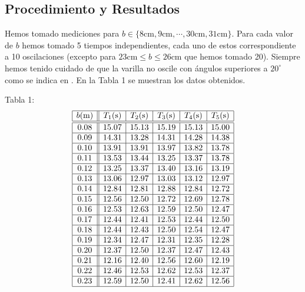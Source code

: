 \documentclass{article}
\begin{document}
\begin{multicols}{2}
\section*{Procedimiento y Resultados}
Hemos tomado mediciones para $b\in \{8\text{cm}, 9\text{cm}, \cdots, 30\text{cm}, 31\text{cm}\}$. Para cada valor de $b$ hemos tomado 5 tiempos independientes, cada uno de estos correspondiente a 10 oscilaciones (excepto para $23 \text{cm}\le b \le 26\text{cm}$ que hemos tomado 20). Siempre hemos tenido cuidado de que la varilla no oscile con ángulos superiores a $20^\circ$ como se indica en \cite{web}. En la Tabla 1 se muestran los datos obtenidos.
\begin{center}
Tabla 1:
$$
    \begin{array}{|c||c|c|c|c|c|} \hline
        b\text{(m)} & T_1\text{(s)} & T_2\text{(s)} & T_3\text{(s)} & T_4\text{(s)} & T_5\text{(s)} \\ \hline\hline
        0.08 & 15.07 & 15.13 & 15.19 & 15.13 & 15.00  \\ \hline
        0.09 & 14.31 & 13.28 & 14.31 & 14.28 & 14.38  \\ \hline
        0.10 & 13.91 & 13.91 & 13.97 & 13.82 & 13.78  \\ \hline
        0.11 & 13.53 & 13.44 & 13.25 & 13.37 & 13.78  \\ \hline
        0.12 & 13.25 & 13.37 & 13.40 & 13.16 & 13.19  \\ \hline
        0.13 & 13.06 & 12.97 & 13.03 & 13.12 & 12.97  \\ \hline
        0.14 & 12.84 & 12.81 & 12.88 & 12.84 & 12.72  \\ \hline
        0.15 & 12.56 & 12.50 & 12.72 & 12.69 & 12.78  \\ \hline
        0.16 & 12.53 & 12.63 & 12.59 & 12.50 & 12.47  \\ \hline
        0.17 & 12.44 & 12.41 & 12.53 & 12.44 & 12.50  \\ \hline
        0.18 & 12.44 & 12.43 & 12.50 & 12.54 & 12.47  \\ \hline
        0.19 & 12.34 & 12.47 & 12.31 & 12.35 & 12.28  \\ \hline
        0.20 & 12.37 & 12.50 & 12.37 & 12.47 & 12.43  \\ \hline
        0.21 & 12.16 & 12.40 & 12.56 & 12.60 & 12.19  \\ \hline
        0.22 & 12.46 & 12.53 & 12.62 & 12.53 & 12.37  \\ \hline
        0.23 & 12.59 & 12.50 & 12.41 & 12.62 & 12.56  \\ \hline

\end{array}$$
\end{center}
\end{multicols}
\end{document}
